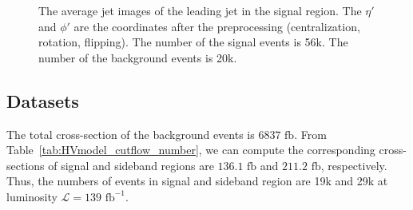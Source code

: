 \documentclass[12pt]{article}
\begin{document}
        \begin{figure}[htpb]
            \centering
            \caption{The average jet images of the leading jet in the signal region. The $\eta'$ and $\phi'$ are the coordinates after the preprocessing (centralization, rotation, flipping). The number of the signal events is 56k. The number of the background events is 20k.}
            \label{fig:HVmodel_jet_image_average}
        \end{figure}
    \subsection{Datasets}%
    \label{sub:datasets}
        The total cross-section of the background events is $6837 \text{ fb}$. From Table~\ref{tab:HVmodel_cutflow_number}, we can compute the corresponding cross-sections of signal and sideband regions are $136.1 \text{ fb}$ and $211.2 \text{ fb}$, respectively. Thus, the numbers of events in signal and sideband region are 19k and 29k at luminosity $\mathcal{L} = 139 \text{ fb}^{-1}$.
\end{document}
